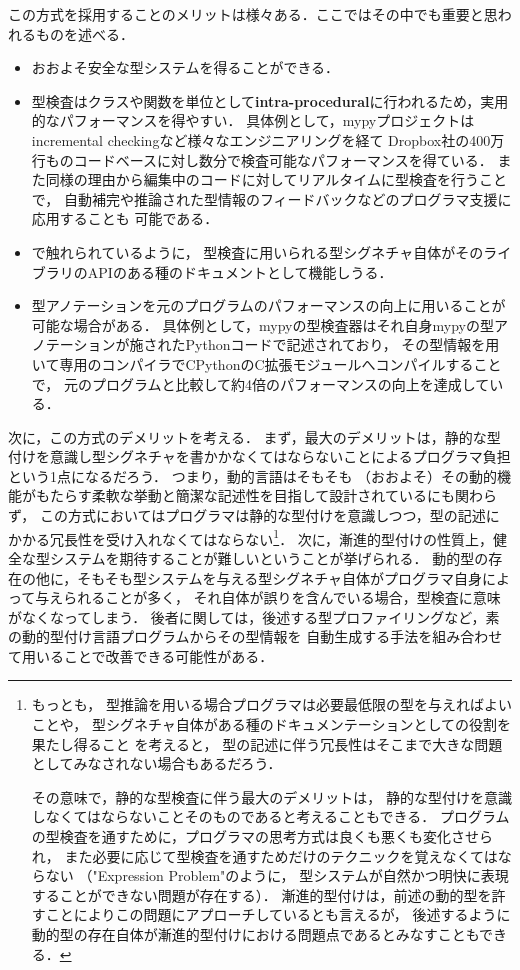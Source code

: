 この方式を採用することのメリットは様々ある．ここではその中でも重要と思われるものを述べる．
\begin{itemize}
  \item おおよそ安全な型システムを得ることができる．
  \item 型検査はクラスや関数を単位として\textbf{intra-procedural}に行われるため，実用的なパフォーマンスを得やすい．
        具体例として，mypyプロジェクトはincremental checkingなど様々なエンジニアリングを経て
        Dropbox社の400万行ものコードベースに対し数分で検査可能なパフォーマンスを得ている\cite{dropbox}．
        また同様の理由から編集中のコードに対してリアルタイムに型検査を行うことで，
        自動補完や推論された型情報のフィードバックなどのプログラマ支援に応用することも
        可能である\cite{flow, typescript}．
  \item \cite{ruby-progress-report}で触れられているように，
        型検査に用いられる型シグネチャ自体がそのライブラリのAPIのある種のドキュメントとして機能しうる．
  \item 型アノテーションを元のプログラムのパフォーマンスの向上に用いることが可能な場合がある．
        具体例として，mypyの型検査器はそれ自身mypyの型アノテーションが施されたPythonコードで記述されており，
        その型情報を用いて専用のコンパイラでCPythonのC拡張モジュールへコンパイルすることで，
        元のプログラムと比較して約4倍のパフォーマンスの向上を達成している\cite{dropbox}．
\end{itemize}

次に，この方式のデメリットを考える．
まず，最大のデメリットは，静的な型付けを意識し型シグネチャを書かかなくてはならないことによるプログラマ負担という1点になるだろう．
つまり，動的言語はそもそも
（おおよそ）その動的機能がもたらす柔軟な挙動と簡潔な記述性を目指して設計されているにも関わらず，
この方式においてはプログラマは静的な型付けを意識しつつ，型の記述にかかる冗長性を受け入れなくてはならない\footnote{
  もっとも，
  型推論を用いる場合プログラマは必要最低限の型を与えればよいことや，
  型シグネチャ自体がある種のドキュメンテーションとしての役割を果たし得ること
  を考えると，
  型の記述に伴う冗長性はそこまで大きな問題としてみなされない場合もあるだろう．

  その意味で，静的な型検査に伴う最大のデメリットは，
  静的な型付けを意識しなくてはならないことそのものであると考えることもできる\cite{what-is-gradual-typing}．
  プログラムの型検査を通すために，プログラマの思考方式は良くも悪くも変化させられ，
  また必要に応じて型検査を通すためだけのテクニックを覚えなくてはならない
  （"Expression Problem"\cite{wadler1998expression}のように，
  型システムが自然かつ明快に表現することができない問題が存在する）．
  漸進的型付けは，前述の動的型を許すことによりこの問題にアプローチしているとも言えるが，
  後述するように動的型の存在自体が漸進的型付けにおける問題点であるとみなすこともできる．
}．
次に，漸進的型付けの性質上，健全な型システムを期待することが難しいということが挙げられる．
動的型の存在の他に，そもそも型システムを与える型シグネチャ自体がプログラマ自身によって与えられることが多く，
それ自体が誤りを含んでいる場合，型検査に意味がなくなってしまう．
後者に関しては，後述する型プロファイリングなど，素の動的型付け言語プログラムからその型情報を
自動生成する手法を組み合わせて用いることで改善できる可能性がある\footnotemark．

